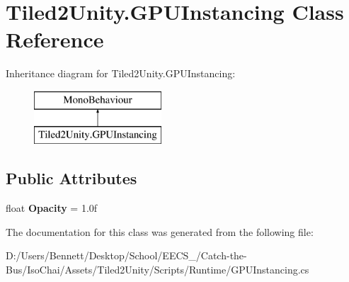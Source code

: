 \hypertarget{class_tiled2_unity_1_1_g_p_u_instancing}{}\section{Tiled2\+Unity.\+G\+P\+U\+Instancing Class Reference}
\label{class_tiled2_unity_1_1_g_p_u_instancing}
Inheritance diagram for Tiled2\+Unity.\+G\+P\+U\+Instancing\+:\begin{figure}[H]
\begin{center}
\leavevmode
\includegraphics[height=2.000000cm]{class_tiled2_unity_1_1_g_p_u_instancing}
\end{center}
\end{figure}
\subsection*{Public Attributes}
\begin{DoxyCompactItemize}
\item 
\mbox{\label{class_tiled2_unity_1_1_g_p_u_instancing_a3d9886fd691a897ed1ed57bd247e6e18}} 
float {\bfseries Opacity} = 1.\+0f
\end{DoxyCompactItemize}


The documentation for this class was generated from the following file\+:\begin{DoxyCompactItemize}
\item 
D\+:/\+Users/\+Bennett/\+Desktop/\+School/\+E\+E\+C\+S\+\_/\+Catch-\/the-\/\+Bus/\+Iso\+Chai/\+Assets/\+Tiled2\+Unity/\+Scripts/\+Runtime/G\+P\+U\+Instancing.\+cs\end{DoxyCompactItemize}
